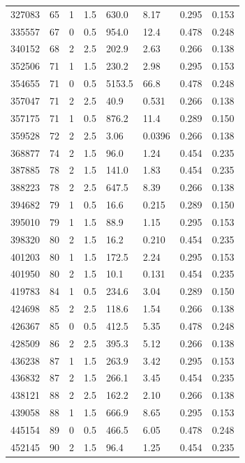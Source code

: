 \documentclass[preview]{standalone}
\begin{document}
{{{\begin{tabular}{L{1.2cm}C{1.2cm} C{0.3cm}C{0.5cm} C{1.4cm}C{1.4cm} C{1.4cm}C{1.4cm}}
  327083  &    65  & 1     & 1.5 &  630.0  & 8.17  & 0.295 &  0.153   \\ 
  335557  &    67  & 0     & 0.5 &  954.0  & 12.4  & 0.478 &  0.248   \\ 
  340152  &    68  & 2     & 2.5 &  202.9  & 2.63  & 0.266 &  0.138   \\ 
  352506  &    71  & 1     & 1.5 &  230.2  & 2.98  & 0.295 &  0.153   \\ 
  354655  &    71  & 0     & 0.5 &  5153.5  & 66.8  & 0.478 &  0.248   \\ 
  357047  &    71  & 2     & 2.5 &  40.9  & 0.531  & 0.266 &  0.138   \\ 
  357175  &    71  & 1     & 0.5 &  876.2  & 11.4  & 0.289 &  0.150   \\ 
  359528  &    72  & 2     & 2.5 &  3.06  & 0.0396  & 0.266 &  0.138   \\ 
  368877  &    74  & 2     & 1.5 &  96.0  & 1.24  & 0.454 &  0.235   \\ 
  387885  &    78  & 2     & 1.5 &  141.0  & 1.83  & 0.454 &  0.235   \\ 
  388223  &    78  & 2     & 2.5 &  647.5  & 8.39  & 0.266 &  0.138   \\ 
  394682  &    79  & 1     & 0.5 &  16.6  & 0.215  & 0.289 &  0.150   \\ 
  395010  &    79  & 1     & 1.5 &  88.9  & 1.15  & 0.295 &  0.153   \\ 
  398320  &    80  & 2     & 1.5 &  16.2  & 0.210  & 0.454 &  0.235   \\ 
  401203  &    80  & 1     & 1.5 &  172.5  & 2.24  & 0.295 &  0.153   \\ 
  401950  &    80  & 2     & 1.5 &  10.1  & 0.131  & 0.454 &  0.235   \\ 
  419783  &    84  & 1     & 0.5 &  234.6  & 3.04  & 0.289 &  0.150   \\ 
  424698  &    85  & 2     & 2.5 &  118.6  & 1.54  & 0.266 &  0.138   \\ 
  426367  &    85  & 0     & 0.5 &  412.5  & 5.35  & 0.478 &  0.248   \\ 
  428509  &    86  & 2     & 2.5 &  395.3  & 5.12  & 0.266 &  0.138   \\ 
  436238  &    87  & 1     & 1.5 &  263.9  & 3.42  & 0.295 &  0.153   \\ 
  436832  &    87  & 2     & 1.5 &  266.1  & 3.45  & 0.454 &  0.235   \\ 
  438121  &    88  & 2     & 2.5 &  162.2  & 2.10  & 0.266 &  0.138   \\ 
  439058  &    88  & 1     & 1.5 &  666.9  & 8.65  & 0.295 &  0.153   \\ 
  445154  &    89  & 0     & 0.5 &  466.5  & 6.05  & 0.478 &  0.248   \\ 
  452145  &    90  & 2     & 1.5 &  96.4  & 1.25  & 0.454 &  0.235   \\ 
\hline 
\end{tabular} 

}}}
\end{document}
